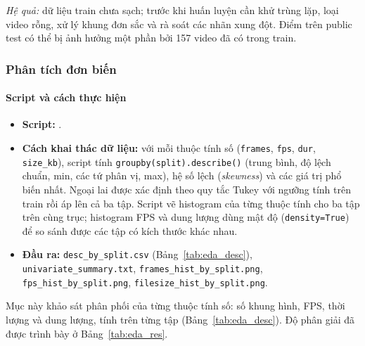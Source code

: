 \noindent\textit{Hệ quả:} dữ liệu train chưa sạch; trước khi huấn luyện cần khử trùng lặp, loại video rỗng, xử lý khung đơn sắc và rà soát các nhãn xung đột. Điểm trên public test có thể bị ảnh hưởng một phần bởi 157 video đã có trong train.

\subsubsection{Phân tích đơn biến}
\label{subsec:eda_uni}

\paragraph{Script và cách thực hiện}
\begin{itemize}
  \item \textbf{Script:} .
  \item \textbf{Cách khai thác dữ liệu:} với mỗi thuộc tính số (\texttt{frames}, \texttt{fps}, \texttt{dur}, \texttt{size\_kb}), script tính \texttt{groupby(\textquotesingle split\textquotesingle).describe()} (trung bình, độ lệch chuẩn, min, các tứ phân vị, max), hệ số lệch (\textit{skewness}) và các giá trị phổ biến nhất. Ngoại lai được xác định theo quy tắc Tukey với ngưỡng tính trên train rồi áp lên cả ba tập. Script vẽ histogram của từng thuộc tính cho ba tập trên cùng trục; histogram FPS và dung lượng dùng mật độ (\texttt{density=True}) để so sánh được các tập có kích thước khác nhau.
  \item \textbf{Đầu ra:} \texttt{desc\_by\_split.csv} (Bảng~\ref{tab:eda_desc}), \texttt{univariate\_summary.txt}, \texttt{frames\_hist\_by\_split.png}, \texttt{fps\_hist\_by\_split.png}, \texttt{filesize\_hist\_by\_split.png}.
\end{itemize}

Mục này khảo sát phân phối của từng thuộc tính số: số khung hình, FPS, thời lượng và dung lượng, tính trên từng tập (Bảng~\ref{tab:eda_desc}). Độ phân giải đã được trình bày ở Bảng~\ref{tab:eda_res}.

